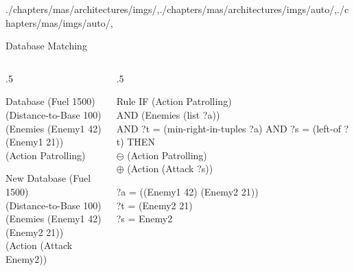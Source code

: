 \begin{graphicspathcontext}{{./chapters/mas/architectures/imgs/},{./chapters/mas/architectures/imgs/auto/},{./chapters/mas/imgs/auto/},\old}
\begin{frame}[t]{Database Matching \insertcontinuationtext}
\begin{columns}[t]
	\begin{column}{.5\linewidth}
		\begin{block}{Database}\ttfamily
			(Fuel 1500) \\
			(Distance-to-Base 100) \\
			(Enemies (Enemy1 42) \\
			       (Enemy1 21)) \\
			(Action Patrolling)
		\end{block}
		\begin{block}{New Database}\ttfamily
			(Fuel 1500) \\
			(Distance-to-Base 100) \\
			(Enemies (Enemy1 42) \\
			(Enemy2 21)) \\
			(Action (Attack Enemy2))
		\end{block}
	\end{column}
	\begin{column}{.5\linewidth}
		\begin{block}{Rule}\ttfamily
			IF (Action Patrolling) \\
			AND (Enemies (list ?a)) \\
			AND ?t = (min-right-in-tuples ?a)
			AND ?s = (left-of ?t)
			THEN \\
			$\ominus$ (Action Patrolling) \\
			$\oplus$ (Action (Attack ?s))
		\end{block}
		\ttfamily
		?a = ((Enemy1 42) (Enemy2 21)) \\
		?t = (Enemy2 21) \\
		?s = Enemy2
	\end{column}
\end{columns}
\end{frame}


\end{graphicspathcontext}

